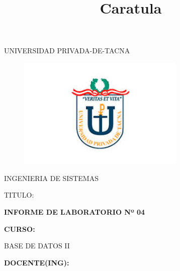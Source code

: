\documentclass[12pt,letterpaper]{article}
\begin{document}
%


\title{Caratula}

\begin{titlepage}
\begin{center}
\large{UNIVERSIDAD PRIVADA-DE-TACNA}\\
\vspace*{-0.025in}
\begin{figure}[htb]
\begin{center}
\includegraphics[width=8cm]{./Imagenes/logo}
\end{center}
\end{figure}
\vspace*{0.15in}
INGENIERIA DE SISTEMAS  \\
\vspace*{0.5in}
\begin{large}
TITULO:\\
\end{large}
\vspace*{0.1in}
\begin{Large}
\textbf{INFORME DE LABORATORIO Nº 04} \\
\end{Large}
\vspace*{0.3in}
\begin{Large}
\textbf{CURSO:} \\
\end{Large}
\vspace*{0.1in}
\begin{large}
BASE DE DATOS II\\
\end{large}
\vspace*{0.3in}
\begin{Large}
\textbf{DOCENTE(ING):} \\
\end{Large}

\end{center}
\end{titlepage}
\end{document}
